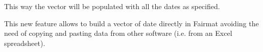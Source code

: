 This way the vector will be populated with all the dates as specified.



This new feature allows to build a vector of date directly in Fairmat avoiding the 
need of copying and pasting data from other software (i.e. from an Excel spreadsheet).


